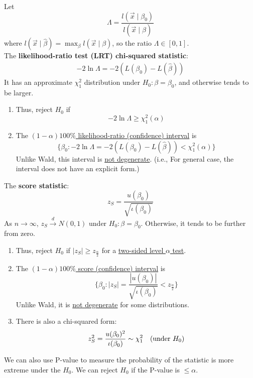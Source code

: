 \documentclass[11pt]{elegantbook}
\begin{document}
\begin{definition}
    \normalfont
    Let $$\Lambda=\frac{l(\vec{x}\mid\beta_0)}{l(\vec{x}\mid\hat{\beta})}$$
    where $l(\vec{x}\mid\hat{\beta})=\max_{\beta}l(\vec{x}\mid\beta)$, so the ratio $\Lambda\in [0,1]$.\\
    The \textbf{likelihood-ratio test (LRT) chi-squared statistic}:
    \begin{equation}
        \begin{aligned}
            -2\ln\Lambda=-2\left(L(\beta_0)-L(\hat{\beta})\right)
        \end{aligned}
        \nonumber
    \end{equation}
    It has an approximate $\chi_1^2$ distribution under $H_0 : \beta = \beta_0$, and otherwise tends to be larger.
    \begin{enumerate}[(1)]
        \item Thus, reject $H_0$ if $$-2\ln\Lambda\geq\chi_1^2(\alpha)$$
        \item The \underline{$(1-\alpha)100\%$ likelihood-ratio (confidence) interval} is $$\{\beta_0:-2\ln\Lambda=-2\left(L(\beta_0)-L(\hat{\beta})\right)<\chi_1^2(\alpha)\}$$
        Unlike Wald, this interval is \underline{not degenerate}. (i.e., For general case, the interval does not have an explicit form.)
    \end{enumerate}
\end{definition}

\begin{definition}
    \normalfont
    The \textbf{score statistic}: $$z_S=\frac{u(\beta_0)}{\sqrt{\iota(\beta_0)}}$$
    As $n \rightarrow \infty$, $z_S \stackrel{d}{\longrightarrow} N(0,1)$ under $H_0:\beta=\beta_0$. Otherwise, it tends to be further from zero.
    \begin{enumerate}[(1)]
        \item Thus, reject $H_0$ if $|z_S|\geq z_{\frac{\alpha}{2}}$ for a \underline{two-sided level $\alpha$ test}.
        \item The \underline{$(1-\alpha)100\%$ score (confidence) interval} is $$\{\beta_0:|z_S|=\frac{|u(\beta_0)|}{\sqrt{\iota(\beta_0)}}<z_{\frac{\alpha}{2}}\}$$
        Unlike Wald, it is \underline{not degenerate} for some distributions.
        \item There is also a chi-squared form:
        \begin{equation}
            \begin{aligned}
                z_S^2=\frac{u(\beta_0)^2}{\iota(\beta_0)}\sim \chi_1^2\quad \textnormal{(under $H_0$)}
            \end{aligned}
            \nonumber
        \end{equation}
    \end{enumerate}
\end{definition}
We can also use P-value to measure the probability of the statistic is more extreme under the $H_0$. We can reject $H_0$ if the P-value is $\leq\alpha$.
\end{document}
